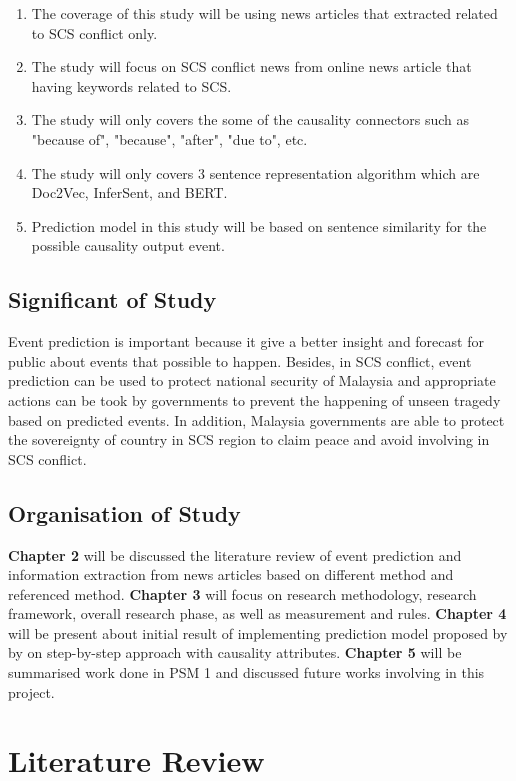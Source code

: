 \documentclass[twoside]{utmthesis}
\begin{document}
\begin{enumerate}
\item The coverage of this study will be using news articles that extracted related to SCS conflict only. 
\item The study will focus on SCS conflict news from online news article that having keywords related to SCS. 
\item The study will only covers the some of the causality connectors such as "because of", "because", "after", "due to", etc.
\item The study will only covers 3 sentence representation algorithm which are Doc2Vec, InferSent, and BERT. 
\item Prediction model in this study will be based on sentence similarity for the possible causality output event. 
\end{enumerate}	

\section{Significant of Study}
Event prediction is important because it give a better insight and forecast for public about events that possible to happen. Besides, in SCS conflict, event prediction can be used to protect national security of Malaysia and appropriate actions can be took by governments to prevent the happening of unseen tragedy based on predicted events. In addition, Malaysia governments are able to protect the sovereignty of country in SCS region to claim peace and avoid involving in SCS conflict.    

\section{Organisation of Study}
\textbf{Chapter 2} will be discussed the literature review of event prediction and information extraction from news articles based on different method and referenced method. \textbf{Chapter 3} will focus on research methodology, research framework, overall research phase, as well as measurement and rules.  \textbf{Chapter 4} will be present about initial result of implementing prediction model proposed by \cite{zhao2017constructing} by on step-by-step approach with causality attributes. \textbf{Chapter 5} will be summarised work done in PSM 1 and discussed future works involving in this project.



\chapter{Literature Review}
\end{document}
